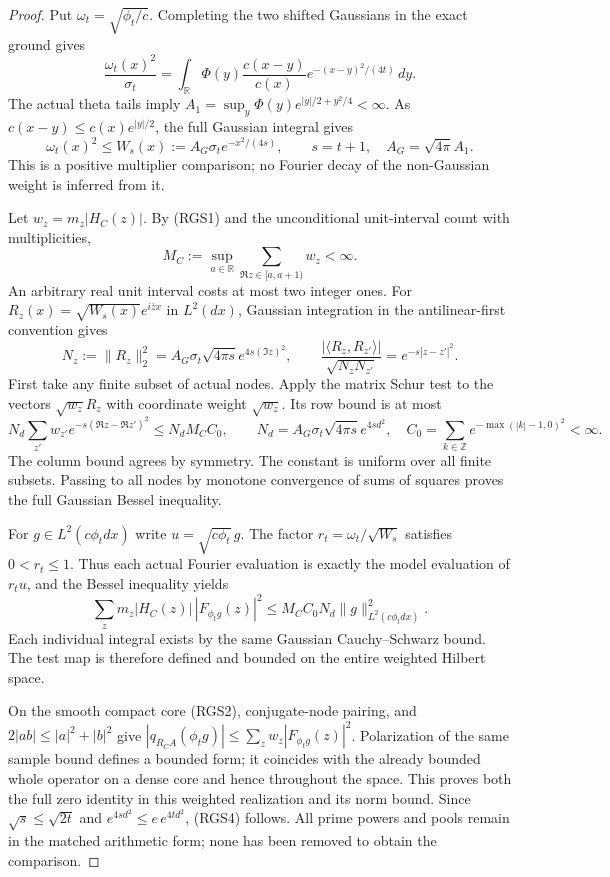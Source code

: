 \documentclass[11pt]{article}
\theoremstyle{remark}\newtheorem{remark}[theorem]{Remark}
\newcommand{\R}{\mathbb R}
\newcommand{\Z}{\mathbb Z}
\begin{document}
\begin{proof}
Put $\omega_t=\sqrt{\phi_t/c}$. Completing the two shifted
Gaussians in the exact ground gives
\[
 \frac{\omega_t(x)^2}{\sigma_t}=
 \int_\R\Phi(y)\frac{c(x-y)}{c(x)}
                    e^{-(x-y)^2/(4t)}\,dy.            \tag{RGS6}
\]
The actual theta tails imply
$A_1=\sup_y\Phi(y)e^{|y|/2+y^2/4}<\infty$.
As $c(x-y)\le c(x)e^{|y|/2}$, the full Gaussian integral gives
\[
 \omega_t(x)^2\le W_s(x):=
 A_G\sigma_t e^{-x^2/(4s)},\qquad
 s=t+1,\quad A_G=\sqrt{4\pi}A_1.                    \tag{RGS7}
\]
This is a positive multiplier comparison; no Fourier decay
of the non-Gaussian weight is inferred from it.

Let $w_z=m_z|H_C(z)|$. By (RGS1) and the unconditional
unit-interval count with multiplicities,
\[
 M_C:=\sup_{a\in\R}
     \sum_{\Re z\in[a,a+1)}w_z<\infty .              \tag{RGS8}
\]
An arbitrary real unit interval costs at most two integer ones.
For $R_z(x)=\sqrt{W_s(x)}e^{i\bar z x}$ in $L^2(dx)$, Gaussian
integration in the antilinear-first convention gives
\[
 N_z:=\|R_z\|_2^2=A_G\sigma_t\sqrt{4\pi s}
                                      e^{4s(\Im z)^2},
 \qquad
 \frac{|\langle R_z,R_{z'}\rangle|}{\sqrt{N_zN_{z'}}}
                         =e^{-s|z-z'|^2}.             \tag{RGS9}
\]
First take any finite subset of actual nodes. Apply the
matrix Schur test to the vectors $\sqrt{w_z}R_z$ with
coordinate weight $\sqrt{w_z}$. Its row bound is at most
\[
 N_d\sum_{z'}w_{z'}e^{-s(\Re z-\Re z')^2}
 \le N_dM_CC_0,\qquad
 N_d=A_G\sigma_t\sqrt{4\pi s}e^{4sd^2},
 \quad C_0=\sum_{k\in\Z}e^{-\max(|k|-1,0)^2}<\infty .
                                                        \tag{RGS10}
\]
The column bound agrees by symmetry. The constant is uniform
over all finite subsets. Passing to all nodes by monotone
convergence of sums of squares proves the full Gaussian
Bessel inequality.

For $g\in L^2(c\phi_tdx)$ write
$u=\sqrt{c\phi_t}\,g$. The factor
$r_t=\omega_t/\sqrt{W_s}$ satisfies $0<r_t\le1$.
Thus each actual Fourier evaluation is exactly the model
evaluation of $r_tu$, and the Bessel inequality yields
\[
 \sum_zm_z|H_C(z)|\,|F_{\phi_tg}(z)|^2
                   \le M_CC_0N_d\|g\|_{L^2(c\phi_tdx)}^2.
                                                        \tag{RGS11}
\]
Each individual integral exists by the same Gaussian
Cauchy--Schwarz bound. The test map is therefore defined and
bounded on the entire weighted Hilbert space.

On the smooth compact core (RGS2), conjugate-node pairing,
and $2|ab|\le|a|^2+|b|^2$ give
$|q_{R_CA}(\phi_tg)|\le\sum_z w_z|F_{\phi_tg}(z)|^2$.
Polarization of the same sample bound defines a bounded form;
it coincides with the already bounded whole operator on a
dense core and hence throughout the space. This proves both
the full zero identity in this weighted realization and its
norm bound. Since $\sqrt{s}\le\sqrt{2t}$ and
$e^{4sd^2}\le e\,e^{4td^2}$, (RGS4) follows.
All prime powers and pools remain in the matched arithmetic
form; none has been removed to obtain the comparison.


\end{proof}
\end{document}
